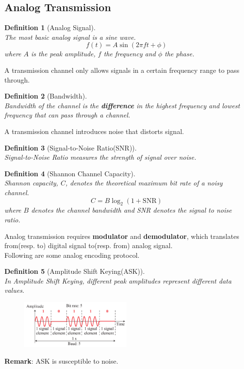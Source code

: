 \documentclass[12pt]{article}
\newtheorem{definition}{Definition}[section]
\theoremstyle{definition}
\begin{document}
\subsection{Analog Transmission}
\begin{definition}[Analog Signal]
\hfill\\\normalfont The most basic analog signal is a sine wave.
\[
f(t)=A\sin(2\pi ft+\phi)
\]
where $A$ is the peak amplitude, $f$ the frequency and $\phi$ the phase.
\end{definition}
A transmission channel only allows signals in a certain frequency range to pass through.
\begin{definition}[Bandwidth]
\hfill\\\normalfont Bandwidth of the channel is the \textbf{difference} in the \textit{highest} frequency and \textit{lowest} frequency that can pass through a channel.
\end{definition}
A transmission channel introduces noise that distorts signal.
\begin{definition}[Signal-to-Noise Ratio(SNR)]
\hfill\\\normalfont Signal-to-Noise Ratio measures the strength of signal over noise.
\end{definition}
\begin{definition}[Shannon Channel Capacity]
\hfill\\\normalfont Shannon capacity, $C$, denotes the theoretical maximum bit rate of a noisy channel.
\[
C=B\log_2(1+\text{SNR})
\]
where $B$ denotes the channel bandwidth and SNR denotes the signal to noise ratio.
\end{definition}
Analog transmission requires \textbf{modulator} and \textbf{demodulator}, which translates from(resp. to) digital signal to(resp. from) analog signal.\\
Following are some analog encoding protocol.
\clearpage
\begin{definition}[Amplitude Shift Keying(ASK)]
\hfill\\\normalfont In Amplitude Shift Keying, different peak amplitudes represent different data values.
\begin{figure}[h]
\centering
\includegraphics[width=0.5\textwidth]{10_2_1.png}
\end{figure}
\end{definition}
\textbf{Remark}: ASK is susceptible to noise.
\end{document}
